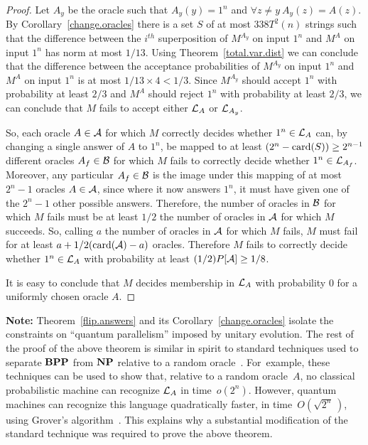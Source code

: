 \begin{proof}
Let $A_y$ be the oracle such that
$A_y (y) = 1^n$ and $\forall z \neq y ~ A_y(z) = A(z)$.
By Corollary~\ref{change.oracles} there is a set $S$ of at most
$338 T^2(n)$ strings such that the difference between the $i^{th}$
superposition of $M^{A_y}$ on input $1^n$ and
$M^A$ on input $1^n$ has norm at most $1/13$.
Using Theorem~\ref{total.var.dist} we can conclude that the difference between
the acceptance probabilities of $M^{A_y}$ on input $1^n$ and
$M^A$ on input $1^n$ is at most $1/13 \times 4 < 1/3$.
Since $M^{A_y}$ should accept $1^n$ with probability at least
$2/3$ and $M^A$ should reject $1^n$ with probability at least
$2/3$, we can conclude that $M$ fails to accept either
${\cal L}_A$ or ${\cal L}_{A_y}$.

So, each oracle $A \in {\cal A}$ for which $M$ correctly decides
whether $1^n \in {\cal L}_A$ can, by changing a single answer
of $A$ to $1^n$, be mapped to at least $(2^n - {\mbox{card}(S)}) \geq 2^{n-1}$
different oracles $A_f \in {\cal B}$ for which $M$ fails to correctly
decide whether $1^n \in {\cal L}_{A_f}$.  Moreover, any particular
$A_f \in {\cal B}$ is the image under this mapping of at most $2^n -1$ oracles
$A \in {\cal A}$, since where it now answers $1^n$, it must have given
one of the $2^n - 1$ other possible answers.
Therefore, the number of oracles in ${\cal B}$ for which $M$ fails
must be at least $1/2$ the number of oracles in
${\cal A}$ for which $M$ succeeds.
So, calling $a$ the number of oracles in $\cal A$ for which $M$ fails,
$M$ must fail for at least $a + 1/2({\mbox{card}(\cal A)} - a)$ oracles.
Therefore $M$ fails to correctly decide whether $1^n \in {\cal L}_A$
with probability at least $(1/2) P[{\cal A}] \geq 1/8$.

It is easy to conclude that $M$ decides
membership in ${\cal L}_A$ with probability $0$ for
a uniformly chosen oracle $A$.
\end{proof}

\noindent
{\bf Note:}
Theorem~\ref{flip.answers} and its Corollary~\ref{change.oracles}
isolate the constraints on ``quantum parallelism'' imposed by
unitary evolution. The rest of the proof of the above theorem is
similar in spirit to standard techniques
used to separate $\mbox{\bf BPP}$ from $\mbox{\bf NP}$ relative to a random oracle~\cite{BG}.
For~example, these techniques can be used to show that, relative to a
random oracle~$A$, no classical
probabilistic machine can recognize ${\cal L}_A$ in time~$o(2^n)$.
However, quantum machines can recognize this language quadratically faster,
in time~$O(\sqrt{2^n}\,)$,
using Grover's algorithm~\cite{Gr}. This explains why a substantial
modification of the standard technique was required to prove the above
theorem.

